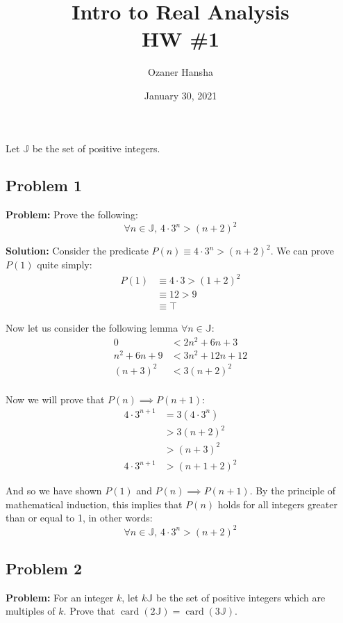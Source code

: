 \documentclass{article}
\newcommand{\posint}{\mathbb J}
\newcommand{\card}[1]{\operatorname{card}(#1)}
\begin{document}
\title{Intro to Real Analysis\\HW \#1}
\author{Ozaner Hansha}
\date{January 30, 2021}
\maketitle

Let $\posint$ be the set of positive integers.

\subsection*{Problem 1}
\noindent\textbf{Problem:} Prove the following:
$$\forall n\in\posint,\,4\cdot3^n>(n+2)^2$$

\noindent\textbf{Solution:} Consider the predicate $P(n)\equiv4\cdot3^n>(n+2)^2$. We can prove $P(1)$ quite simply:
\begin{align*}
    P(1)&\equiv4\cdot3>(1+2)^2\\
    &\equiv12>9\\
    &\equiv\top
\end{align*}

Now let us consider the following lemma $\forall n\in\posint$:
\begin{align*}
    0&<2n^2+6n+3\tag{$n>0\implies 2n^2+6n+3>0$}\\
    n^2+6n+9&<3n^2+12n+12\\
    (n+3)^2&<3(n+2)^2\tag{Lemma 1}\\
\end{align*}

Now we will prove that $P(n)\implies P(n+1)$:
\begin{align*}
    4\cdot3^{n+1}&=3(4\cdot3^n)\tag{additive prop. of exponent}\\
    &>3(n+2)^2\tag{assume the antecedent, $P(n)$}\\
    &>(n+3)^2\tag{Lemma 1}\\
    4\cdot3^{n+1}&>(n+1+2)^2\tag{$P(n+1)$}
\end{align*}

And so we have shown $P(1)$ and $P(n)\implies P(n+1)$. By the principle of mathematical induction, this implies that $P(n)$ holds for all integers greater than or equal to 1, in other words:
$$\forall n\in\posint,\,4\cdot3^n>(n+2)^2$$

\subsection*{Problem 2}
\noindent\textbf{Problem:} For an integer $k$, let $k\posint$ be the set of positive integers which are multiples of $k$. Prove that $\card{2\posint}=\card{3\posint}$.
\bigskip
\end{document}
